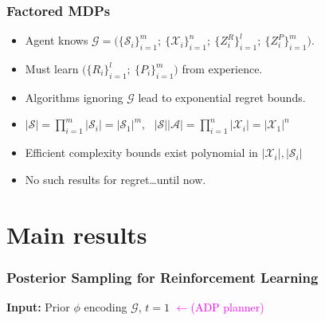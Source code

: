 \documentclass{beamer}
\newlength{\wideitemsep}
\let\olditem\item
\renewcommand{\item}{\setlength{\itemsep}{\wideitemsep}\olditem}
\newcommand{\Xc}{\mathcal{X}}
\newcommand{\Gc}{\mathcal{G}}
\newcommand{\Sc}{\mathcal{S}}
\newcommand{\Ac}{\mathcal{A}}
\begin{document}
\begin{frame}
\frametitle{Factored MDPs}

\begin{itemize}
	\item Agent knows $\Gc  = \big( \{ \Sc_i \}_{i=1}^m ; \  \{ \Xc_i \}_{i=1}^n ; \   \{ Z^R_i \}_{i=1}^l;\  \{ Z^P_i \}_{i=1}^m \big)$.
	\item Must learn $\big( \{R_i \}_{i=1}^l;\  \{ P_i \}_{i=1}^m \big) $ from experience.
	\item Algorithms ignoring $\Gc$ lead to exponential regret bounds.
	\item $|\Sc| = \prod_{i=1}^m|\Sc_i| = |\Sc_1|^m, \ \ \ |\Sc| |\Ac| = \prod_{i=1}^n|\Xc_i| = |\Xc_1|^n$
	\vspace{1cm}
	\pause
	\item Efficient complexity bounds exist polynomial in $|\Xc_i|,|\Sc_i|$
	\item No such results for regret\dots \pause until now.
\end{itemize}
\end{frame}


\section{Main results}

\begin{frame}
\frametitle{Posterior Sampling for Reinforcement Learning}

\begin{algorithm}[H]
\label{alg: PSRL}

\begin{algorithmic}[1]
	\STATE \textbf{Input: }Prior $\phi$ encoding $\Gc$, $t=1$
		  \textcolor{magenta}{$\leftarrow$(ADP planner)}

		\ENDFOR

	\ENDFOR
\end{algorithmic}
\end{algorithm}
\end{frame}
\end{document}
